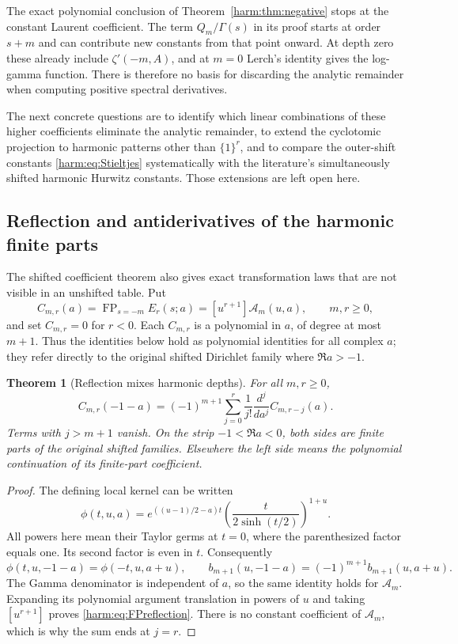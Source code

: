 \documentclass[11pt,letterpaper]{article}
\numberwithin{equation}{section}
\theoremstyle{plain}
\newtheorem{theorem}{Theorem}[section]
\theoremstyle{definition}
\theoremstyle{remark}
\begin{document}
The exact polynomial conclusion of
Theorem~\ref{harm:thm:negative} stops at the constant Laurent
coefficient.  The term $Q_m/\Gamma(s)$ in its proof starts at
order $s+m$ and can contribute new constants from that point
onward.  At depth zero these already include $\zeta'(-m,A)$,
and at $m=0$ Lerch's identity gives the log-gamma function.
There is therefore no basis for discarding the analytic remainder
when computing positive spectral derivatives.

The next concrete questions are to identify which linear combinations
of these higher coefficients eliminate the analytic remainder, to
extend the cyclotomic projection to harmonic patterns other than
$\{1\}^r$, and to compare the outer-shift constants
\eqref{harm:eq:Stieltjes} systematically with the literature's
simultaneously shifted harmonic Hurwitz constants.  Those extensions
are left open here.



\subsection{Reflection and antiderivatives of the harmonic finite parts}
\label{harm:subsec:symmetries}

The shifted coefficient theorem also gives exact transformation laws
that are not visible in an unshifted table. Put
\[
 C_{m,r}(a)=\operatorname{FP}_{s=-m}E_r(s;a)
          =[u^{r+1}]\mathcal A_m(u,a),\qquad m,r\geq0,
\]
and set \(C_{m,r}=0\) for \(r<0\).
Each \(C_{m,r}\) is a polynomial in \(a\), of degree at most \(m+1\).
Thus the identities below hold as polynomial identities for all complex
\(a\); they refer directly to the original shifted Dirichlet family
where \(\Re a>-1\).

\begin{theorem}[Reflection mixes harmonic depths]
\label{harm:thm:reflection}
For all \(m,r\geq0\),
\begin{equation}\label{harm:eq:FPreflection}
 C_{m,r}(-1-a)
 =(-1)^{m+1}\sum_{j=0}^{r}
          \frac{1}{j!}\frac{d^j}{da^j}C_{m,r-j}(a).
\end{equation}
Terms with \(j>m+1\) vanish. On the strip \(-1<\Re a<0\),
both sides are finite parts of the original shifted families.
Elsewhere the left side means the polynomial continuation of its
finite-part coefficient.
\end{theorem}

\begin{proof}
The defining local kernel can be written
\[
 \phi(t,u,a)=
 e^{((u-1)/2-a)t}
 \left(\frac{t}{2\sinh(t/2)}\right)^{1+u}.
\]
All powers here mean their Taylor germs at \(t=0\), where the
parenthesized factor equals one. Its second factor is even in \(t\).
Consequently
\[
 \phi(t,u,-1-a)=\phi(-t,u,a+u),\qquad
 b_{m+1}(u,-1-a)=(-1)^{m+1}b_{m+1}(u,a+u).
\]
The Gamma denominator is independent of \(a\), so the same identity
holds for \(\mathcal A_m\). Expanding its polynomial argument
translation in powers of \(u\) and taking \([u^{r+1}]\) proves
\eqref{harm:eq:FPreflection}. There is no constant coefficient of
\(\mathcal A_m\), which is why the sum ends at \(j=r\).
\end{proof}
\end{document}
